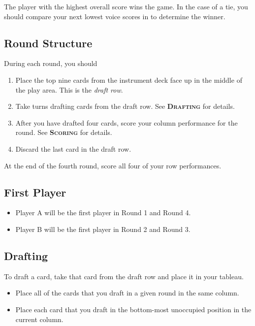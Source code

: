 \documentclass[a6paper, 12pt, parskip=half, DIV=14]{scrartcl}
\begin{document}
The player with the highest overall score wins the game. In the case of a tie, you should compare your next lowest voice scores in to determine the winner. 

\newpage
\enlargethispage{1.75\baselineskip}
\subsection*{Round Structure}
During each round, you should
\begin{enumerate}[leftmargin=4ex]
\item Place the top nine cards from the instrument deck face up in the middle of the play area. This is the \emph{draft row}.

\item Take turns drafting cards from the draft row. See \textcolor{redfabric}{\textbf{\scshape{Drafting}}} for details.

\item After you have drafted four cards, score your column performance for the round. See \textcolor{redfabric}{\textbf{\scshape{Scoring}}} for details.

\item Discard the last card in the draft row.
\end{enumerate}

At the end of the fourth round, score all four of your row performances.

\subsection*{First Player}
\begin{itemize}[leftmargin=4ex]
\item Player A will be the first player in Round 1 and Round 4.
\item Player B will be the first player in Round 2 and Round 3.
\end{itemize}

\newpage
\enlargethispage{1.75\baselineskip}
\subsection*{Drafting}
To draft a card, take that card from the draft row and place it in your tableau.
\begin{itemize}[leftmargin=4ex]
\item Place all of the cards that you draft in a given round in the same column.
\item Place each card that you draft in the bottom-most unoccupied position in the current column.
\end{itemize}
\end{document}

